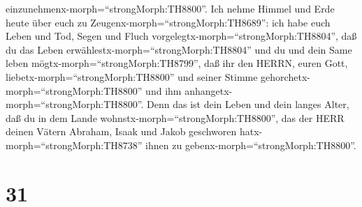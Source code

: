 einzunehmenx-morph=``strongMorph:TH8800''.  Ich nehme
Himmel und Erde heute über euch zu Zeugenx-morph=``strongMorph:TH8689'':
ich habe euch Leben und Tod, Segen und Fluch
vorgelegtx-morph=``strongMorph:TH8804'', daß du das Leben
erwählestx-morph=``strongMorph:TH8804'' und du und dein Same leben
mögtx-morph=``strongMorph:TH8799'',  daß ihr den HERRN,
euren Gott, liebetx-morph=``strongMorph:TH8800'' und seiner Stimme
gehorchetx-morph=``strongMorph:TH8800'' und ihm
anhangetx-morph=``strongMorph:TH8800''. Denn das ist dein Leben und dein
langes Alter, daß du in dem Lande wohnstx-morph=``strongMorph:TH8800'',
das der HERR deinen Vätern Abraham, Isaak und Jakob geschworen
hatx-morph=``strongMorph:TH8738'' ihnen zu
gebenx-morph=``strongMorph:TH8800''.

\hypertarget{section-30}{%
\section{31}\label{section-30}}

